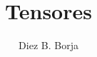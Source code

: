 \documentclass[letterpaper, onecolumn, 11pt]{report}
\begin{document}
\sffamily
\title{\Huge\textbf{{Tensores}}}
\author{Diez B. Borja}
\maketitle

\end{document}
